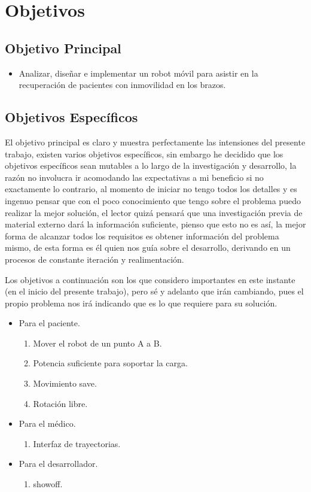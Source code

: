 \chapter{Objetivos}
\section{Objetivo Principal}
\begin{itemize}
	\item Analizar, diseñar e implementar un robot móvil para asistir en la 
		recuperación de pacientes con inmovilidad en los brazos.
\end{itemize}
\section{Objetivos Específicos}
El objetivo principal es claro y muestra perfectamente las intensiones del presente
trabajo, existen varios objetivos específicos, sin embargo he decidido que los 
objetivos específicos sean mutables a lo largo de la investigación y desarrollo,
la razón no involucra ir acomodando las expectativas a mi beneficio si no 
exactamente lo contrario, al momento de iniciar no tengo todos los detalles y es
ingenuo pensar que con el poco conocimiento que tengo sobre el problema puedo 
realizar la mejor solución, el lector quizá pensará que una investigación 
previa de material externo dará la información suficiente, pienso que esto no 
es así, la mejor forma de alcanzar todos los requisitos es obtener información del
problema mismo, de esta forma es él quien nos guía sobre el desarrollo,
derivando en un procesos de
constante iteración y realimentación.

Los objetivos a continuación son los que considero importantes en este instante 
(en el inicio del presente trabajo), pero sé y adelanto que irán cambiando, pues
el propio problema nos irá indicando que es lo que requiere para su solución.
\begin{itemize}
	\item Para el paciente.
		\begin{enumerate}
			\item Mover el robot de un punto A a B.
			\item Potencia suficiente para soportar la carga.
			\item Movimiento save.
			\item Rotación libre.
		\end{enumerate}
	\item Para el médico.
		\begin{enumerate}
			\item Interfaz de trayectorias.
		\end{enumerate}
	\item Para el desarrollador.
		\begin{enumerate}
			\item showoff.
		\end{enumerate}
\end{itemize}
